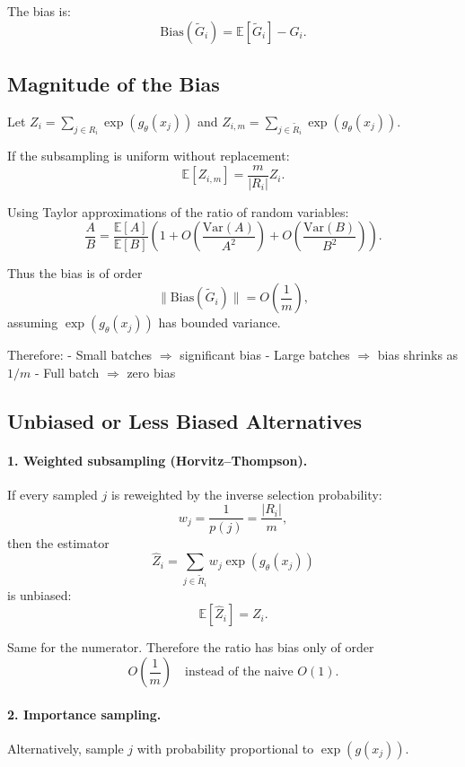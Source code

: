 \documentclass{article}
\begin{document}
The bias is:
\[
\mathrm{Bias}(\widetilde{G}_i)
=
\mathbb{E}[\widetilde{G}_i] - G_i.
\]

\subsection{Magnitude of the Bias}

Let $Z_{i} = \sum_{j \in R_i} \exp(g_\theta(x_j))$ and
$Z_{i,m} = \sum_{j \in \widetilde{R}_i} \exp(g_\theta(x_j))$.

If the subsampling is uniform without replacement:
\[
\mathbb{E}[Z_{i,m}]
= \frac{m}{|R_i|} Z_i.
\]

Using Taylor approximations of the ratio of random variables:
\[
\frac{A}{B} =
\frac{\mathbb{E}[A]}{\mathbb{E}[B]}
\left(
1 + O\!\left(\frac{\mathrm{Var}(A)}{A^2}\right)
+
O\!\left(\frac{\mathrm{Var}(B)}{B^2}\right)
\right).
\]

Thus the bias is of order
\[
\|\mathrm{Bias}(\widetilde{G}_i)\|
=
O\left(
\frac{1}{m}
\right),
\]
assuming $\exp(g_\theta(x_j))$ has bounded variance.

Therefore:
- Small batches $\Rightarrow$ significant bias
- Large batches $\Rightarrow$ bias shrinks as $1/m$
- Full batch $\Rightarrow$ zero bias

\subsection{Unbiased or Less Biased Alternatives}

\paragraph{1. Weighted subsampling (Horvitz–Thompson).}

If every sampled $j$ is reweighted by the inverse selection probability:
\[
w_j = \frac{1}{p(j)} = \frac{|R_i|}{m},
\]
then the estimator
\[
\widehat{Z}_i = \sum_{j \in \widetilde{R}_i} w_j \exp(g_\theta(x_j))
\]
is unbiased:
\[
\mathbb{E}[\widehat{Z}_i] = Z_i.
\]

Same for the numerator.
Therefore the ratio has bias only of order
\[
O\!\left(\frac{1}{m}\right)
\quad\text{instead of the naive } O(1).
\]

\paragraph{2. Importance sampling.}

Alternatively, sample $j$ with probability proportional to $\exp(g(x_j))$.
\end{document}
